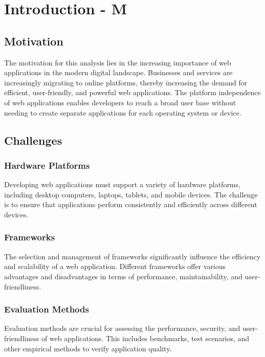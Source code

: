 \chapter{Introduction - M}
\label{cha:Introduction}


\section{Motivation}
The motivation for this analysis lies in the increasing importance of web applications in the modern digital landscape. Businesses and services are increasingly migrating to online platforms, thereby increasing the demand for efficient, user-friendly, and powerful web applications. The platform independence of web applications enables developers to reach a broad user base without needing to create separate applications for each operating system or device. \cite{unctad}

\section{Challenges}

\subsection{Hardware Platforms}
Developing web applications must support a variety of hardware platforms, including desktop computers, laptops, tablets, and mobile devices. The challenge is to ensure that applications perform consistently and efficiently across different devices. \cite{mao2014developing}

\subsection{Frameworks}
The selection and management of frameworks significantly influence the efficiency and scalability of a web application. Different frameworks offer various advantages and disadvantages in terms of performance, maintainability, and user-friendliness. \cite{verma2022comparison}

\subsection{Evaluation Methods}
Evaluation methods are crucial for assessing the performance, security, and user-friendliness of web applications. This includes benchmarks, test scenarios, and other empirical methods to verify application quality. \cite{verma2022comparison}

